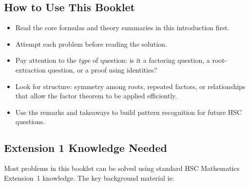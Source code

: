 \documentclass[12pt]{article}
\begin{document}
\subsection{How to Use This Booklet}
\begin{itemize}[leftmargin=*]
  \item Read the core formulas and theory summaries in this introduction first.
  \item Attempt each problem before reading the solution.
  \item Pay attention to the \emph{type} of question: is it a factoring question, a root-extraction question, or a proof using identities?
  \item Look for structure: symmetry among roots, repeated factors, or relationships that allow the factor theorem to be applied efficiently.
  \item Use the remarks and takeaways to build pattern recognition for future HSC questions.
\end{itemize}

\subsection{Extension 1 Knowledge Needed}
Most problems in this booklet can be solved using standard HSC Mathematics Extension~1 knowledge. The key background material is:
\end{document}
